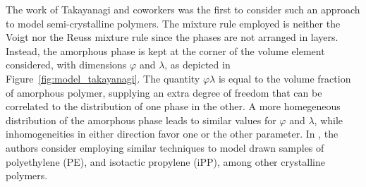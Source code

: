 The work of Takayanagi and coworkers \citep{takayanagiApplicationEquivalentModel1964} was the first to consider such an approach to model semi-crystalline polymers.
The mixture rule employed is neither the Voigt nor the Reuss mixture rule since the phases are not arranged in layers.
Instead, the amorphous phase is kept at the corner of the volume element considered, with dimensions $\varphi$ and $\lambda$, as depicted in Figure~\ref{fig:model_takayanagi}.
The quantity $\varphi \lambda$ is equal to the volume fraction of amorphous polymer, supplying an extra degree of freedom that can be correlated to the distribution of one phase in the other.
A more homegeneous distribution of the amorphous phase leads to similar values for $\varphi$ and $\lambda$, while inhomogeneities in either direction favor one or the other parameter.
In \cite{takayanagiMechanicalPropertiesFine1967}, the authors consider employing similar techniques to model drawn samples of polyethylene (PE), and isotactic propylene (iPP), among other crystalline polymers.
